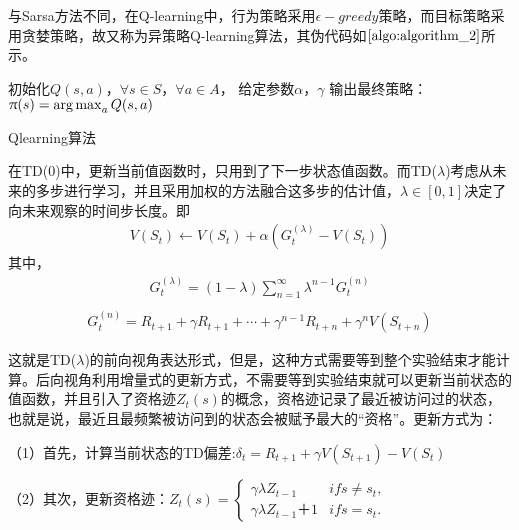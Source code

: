 与Sarsa方法不同，在Q-learning中，行为策略采用$\epsilon-greedy$策略，而目标策略采用贪婪策略，故又称为异策略Q-learning算法，其伪代码如$\ref{algo:algorithm_2}$所示。
\begin{algorithm}[htbp]
\small
\SetAlgoLined
{} 
初始化$Q(s,a)$，$\forall s \in S$，$\forall a \in A$， 给定参数$\alpha$，$\gamma$\;
输出最终策略：$\uppi(s)=\operatorname*{arg\,max}_{a}Q(s,a)$\;
\caption{Qlearning算法}
\label{algo:algorithm_2}
\end{algorithm}

在TD(0)中，更新当前值函数时，只用到了下一步状态值函数。而TD($\lambda$)考虑从未来的多步进行学习，并且采用加权的方法融合这多步的估计值，$\lambda \in [0,1]$决定了向未来观察的时间步长度。即
\begin{equation}
\begin{aligned}
V(S_{t} )\gets V(S_{t})+\alpha (G^{(\lambda)}_{t}-V(S_{t}))
\end{aligned}
\end{equation}
其中，
\begin{displaymath}
\begin{aligned}
G^{(\lambda)}_{t}=(1-\lambda) \sum_{n=1}^{\infty} \lambda^{n-1} G^{(n)}_{t}\\
\end{aligned}
\end{displaymath}
\begin{displaymath}
\begin{aligned}
G^{(n)}_{t}=R_{t+1}+\gamma R_{t+1}+ \cdots +\gamma^{n-1} R_{t+n}+\gamma^{n} V(S_{t+n})
\end{aligned}
\end{displaymath}

这就是TD($\lambda$)的前向视角表达形式，但是，这种方式需要等到整个实验结束才能计算。后向视角利用增量式的更新方式，不需要等到实验结束就可以更新当前状态的值函数，并且引入了资格迹$Z_{t}(s)$的概念，资格迹记录了最近被访问过的状态，也就是说，最近且最频繁被访问到的状态会被赋予最大的“资格”。更新方式为：

（1）首先，计算当前状态的TD偏差:$\delta_{t}=R_{t+1}+\gamma V(S_{t+1})-V(S_{t})$

（2）其次，更新资格迹：$Z_{t}(s) = 
    \begin{cases}
        \gamma \lambda Z_{t-1} & if s \neq s_{t},\\
        \gamma \lambda Z_{t-1}＋1 & if s = s_{t}.
    \end{cases}$

